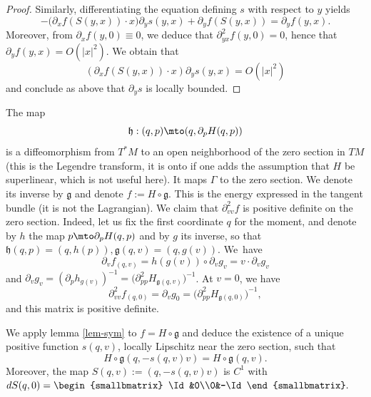 \begin{proof}
Similarly, differentiating the equation defining $s$ with respect to $y$ yields
\[
-\big(\partial_xf(S(y,x))\cdot x \big) \partial_y s(y,x)+ \partial_y f(S(y,x))=\partial_y f(y,x).
\]
Moreover, from $\partial_xf(y,0)\equiv 0$, we deduce that $\partial^2_{yx}f (y,0)=0$, hence that
$\partial_yf(y,x)= O(|x|^2)$.
We obtain that
\[
(\partial_xf({S(y,x)})\cdot x ) \partial_y s(y,x)=O(|x|^2)
\]
and conclude as above that $\partial_y s$ is locally bounded.
\end{proof}

The map
\[
\mathfrak{h}: (q,p)\mto (q, \partial_pH(q,p))
\]
is a diffeomorphism from $T^*M$ to an open neighborhood of the zero section in $TM$ (this is the Legendre transform, it is onto if one adds the assumption that $H$ be superlinear, which is not useful here).
It maps $\Gamma$ to the zero section. We denote its inverse by
$
\mathfrak{g}
$ and denote $f:= H\circ \mathfrak{g}$. This is the energy expressed in the tangent bundle
(it is not the Lagrangian).
We claim that $\partial^2_{vv}f$ is positive definite on the zero section.
Indeed, let us fix the first coordinate $q$ for the moment, and denote by $h$ the map $p\mto \partial_pH(q,p)$ and by $g$ its inverse, so that $\mathfrak{h}(q,p)=(q,h(p)),\mathfrak{g}(q,v)=(q,g(v))$.
We~have
\[
\partial_vf_{(q,v)}=
h(g(v))\circ \partial_vg_v
=v\cdot \partial_vg_v
\]
and $\partial_vg_v= (\partial_ph_{g(v)})^{-1}=\big(\partial^2_{pp}H_{\mathfrak{g}(q,v)}\big)^{-1}$.
At $v=0$, we have
\[
\partial^2_{vv}f_{(q,0)}=\partial_vg_0=\big(\partial^2_{pp}H_{\mathfrak{g}(q,0)}\big)^{-1},
\]
and this matrix is positive definite.

We apply lemma \ref{lem-sym} to $f=H\circ \mathfrak{g}$ and deduce the existence of a unique positive function $s(q,v)$,
locally Lipschitz near the zero section, such that
\[
H\circ \mathfrak{g} (q, -s(q,v)v)=H\circ \mathfrak{g}(q, v).
\]
Moreover, the map $S(q,v):= (q, -s(q,v)v)$ is $C^1$ with
$dS(q,0)=
\begin{smallbmatrix}
\Id&0\\0&-\Id
\end{smallbmatrix}.$

